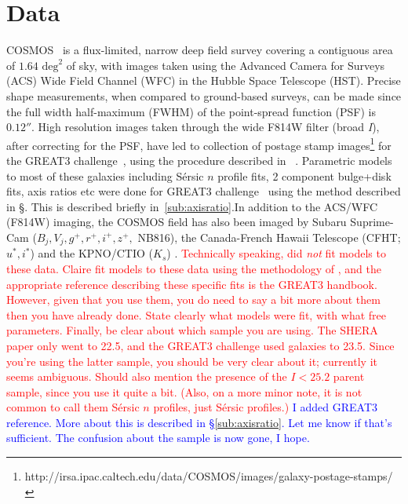 \documentclass[twocolumn,useAMS,usenatbib]{mn2e}
\newcommand{\rachel}[1]{{\textcolor{red}{#1}}}
\newcommand{\arun}[1]{{\textcolor{blue}{#1}}}
\newcommand{\sersicn}{S\'{e}rsic $n$ }
\newcommand{\sersic}{S\'{e}rsic }
\begin{document}
\section{Data}
\label{S:data}
COSMOS~\citep{COSMOS_overview, COSMOS_generic, COSMOS_Alexie} is a flux-limited, narrow deep field survey covering a contiguous area of $1.64 \text{ deg}^2$ of sky, with images taken using the Advanced Camera for Surveys (ACS) Wide Field Channel (WFC)
in the Hubble Space Telescope (HST). Precise shape measurements, when compared to ground-based surveys, can be made since the full width half-maximum (FWHM) of the point-spread function (PSF)
is $0.12''$. High resolution images taken through the wide F814W filter (broad \emph{I}), after correcting for the PSF, have led to collection of postage stamp images\footnote{http://irsa.ipac.caltech.edu/data/COSMOS/images/galaxy-postage-stamps/} for the GREAT3 challenge~\citep{great3}, using the procedure described in ~\cite{SHERA}.
Parametric models to most of these galaxies including \sersicn profile fits, 
2 component bulge+disk fits, axis ratios etc were done for GREAT3 challenge~\citep{great3} using the method described in \S\cite{Claire_Fits}. This is described briefly in~\ref{sub:axisratio}.In addition to the ACS/WFC (F814W) imaging, the COSMOS field has also been imaged by Subaru Suprime-Cam ($B_j, V_j, g^+,r^+,i^+,z^+,$ NB816), the
Canada-French Hawaii Telescope (CFHT;$u^*,i^*$) and the KPNO/CTIO ($K_s$) .
\rachel{Technically speaking, \cite{Claire_Fits} did {\em not} fit
  models to these data.  Claire fit models to these data using the
  methodology of \cite{Claire_Fits}, and the appropriate reference
  describing these specific fits is the GREAT3 handbook.  However,
  given that you use them, you do need to say a bit more about them
  then you have already done.  State clearly what models were fit,
  with what free parameters. Finally, be clear about which sample you
  are using.  The SHERA paper only went to 22.5, and the GREAT3
  challenge used galaxies to 23.5.  Since you're using the latter
  sample, you should be very clear about it; currently it seems
  ambiguous. Should also mention the presence of the $I<25.2$ parent
  sample, since you use it quite a bit. (Also, on a more minor note, it is not
  common to call them \sersicn{} profiles, just \sersic{} profiles.)}
\arun{I added GREAT3 reference. More about this is described in \S\ref{sub:axisratio}. Let me know if that's sufficient. The confusion about the sample is now gone, I hope.} 
	      
\end{document}
